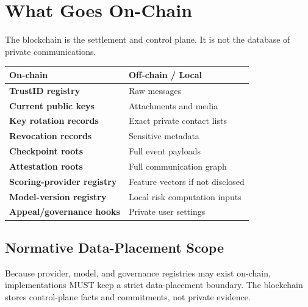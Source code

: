\documentclass[11pt]{article}
\begin{document}
\section{What Goes On-Chain}

The blockchain is the settlement and control plane. It is not the database of private communications.

\begin{center}
\begin{tabularx}{\textwidth}{>{\bfseries}p{} X}
\toprule
On-chain & Off-chain / Local \\
\midrule
TrustID registry & Raw messages \\
Current public keys & Attachments and media \\
Key rotation records & Exact private contact lists \\
Revocation records & Sensitive metadata \\
Checkpoint roots & Full event payloads \\
Attestation roots & Full communication graph \\
Scoring-provider registry & Feature vectors if not disclosed \\
Model-version registry & Local risk computation inputs \\
Appeal/governance hooks & Private user settings \\
\bottomrule
\end{tabularx}
\end{center}



\subsection{Normative Data-Placement Scope}

Because provider, model, and governance registries may exist on-chain, implementations MUST keep a strict data-placement boundary. The blockchain stores control-plane facts and commitments, not private evidence.
\end{document}
